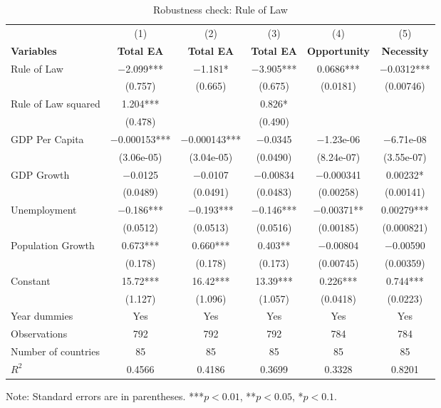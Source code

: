 \documentclass[12pt]{article}
\begin{document}
\begin{table}[H]
    \centering
    \caption{Robustness check: Rule of Law}
    \label{tab:robustness_rule_of_law}
    \small
    \begin{tabular}{l c c c c c}
        \toprule
        & (1) & (2) & (3) & (4) & (5) \\
        \textbf{Variables} & \textbf{Total EA} & \textbf{Total EA} & \textbf{Total EA} & \textbf{Opportunity} & \textbf{Necessity} \\
        \midrule
        Rule of Law & $-$2.099*** & $-$1.181* & $-$3.905*** & 0.0686*** & $-$0.0312*** \\
        & (0.757) & (0.665) & (0.675) & (0.0181) & (0.00746) \\[6pt]
        Rule of Law squared & 1.204*** & & 0.826* & & \\
        & (0.478) & & (0.490) & & \\[6pt]
        GDP Per Capita & $-$0.000153*** & $-$0.000143*** & $-$0.0345 & $-$1.23e-06 & $-$6.71e-08 \\
        & (3.06e-05) & (3.04e-05) & (0.0490) & (8.24e-07) & (3.55e-07) \\[6pt]
        GDP Growth & $-$0.0125 & $-$0.0107 & $-$0.00834 & $-$0.000341 & 0.00232* \\
        & (0.0489) & (0.0491) & (0.0483) & (0.00258) & (0.00141) \\[6pt]
        Unemployment & $-$0.186*** & $-$0.193*** & $-$0.146*** & $-$0.00371** & 0.00279*** \\
        & (0.0512) & (0.0513) & (0.0516) & (0.00185) & (0.000821) \\[6pt]
        Population Growth & 0.673*** & 0.660*** & 0.403** & $-$0.00804 & $-$0.00590 \\
        & (0.178) & (0.178) & (0.173) & (0.00745) & (0.00359) \\[6pt]
        Constant & 15.72*** & 16.42*** & 13.39*** & 0.226*** & 0.744*** \\
        & (1.127) & (1.096) & (1.057) & (0.0418) & (0.0223) \\
        \midrule
        Year dummies & Yes & Yes & Yes & Yes & Yes \\
        Observations & 792 & 792 & 792 & 784 & 784 \\
        Number of countries & 85 & 85 & 85 & 85 & 85 \\
        $R^2$ & 0.4566 & 0.4186 & 0.3699 & 0.3328 & 0.8201 \\
        \bottomrule
    \end{tabular}
    \par\smallskip
    \footnotesize Note: Standard errors are in parentheses. ***$p<0.01$, **$p<0.05$, *$p<0.1$.
\end{table}
\end{document}
